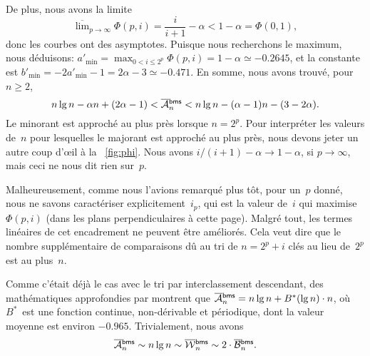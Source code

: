 De plus, nous avons la limite
\begin{equation*}
  \overline\lim_{p \to \infty}\Phi(p,i) = \frac{i}{i+1} - \alpha <
  1 - \alpha = \Phi(0,1),
\end{equation*}
donc les courbes ont des asymptotes. Puisque nous recherchons le
maximum, nous déduisons: \(a'_{\min} = \max_{0 < i \leqslant
  2^p}\Phi(p,i) = 1 - \alpha \simeq -0.2645\), et la constante est
\(b'_{\min} = -2a'_{\min} - 1 = 2\alpha - 3 \simeq -0.471\). En somme,
nous avons trouvé, pour \(n \geqslant 2\),
\begin{equation}
n\lg n - \alpha n + (2\alpha - 1) < \OM{\fun{bms}}{n}
< n\lg n - (\alpha - 1)n - (3 - 2\alpha).
\label{ineq:bounds_Mbms}
\end{equation}
Le minorant est approché au plus près lorsque \(n=2^p\). Pour
interpréter les valeurs de~\(n\) pour lesquelles le majorant est
approché au plus près, nous devons jeter un autre coup d'œil à la
\fig~\vref{fig:phi}. Nous avons \(i/(i+1) - \alpha \to 1 - \alpha\),
si \(p \to \infty\), mais ceci ne nous dit rien
sur~\(p\).

Malheureusement, comme nous l'avions remarqué plus tôt, pour un~\(p\)
donné, nous ne savons caractériser explicitement~\(i_p\), qui est la
valeur de~\(i\) qui maximise \(\Phi(p,i)\) (dans les plans
perpendiculaires à cette page). Malgré tout, les termes linéaires de
cet encadrement ne peuvent être améliorés. Cela veut dire que le
nombre supplémentaire de comparaisons dû au tri de \(n=2^p+i\) clés au
lieu de~\(2^p\) est au plus~\(n\).

Comme c'était déjà le cas avec le tri par interclassement descendant,
des mathématiques approfondies par \cite{PannyProdinger_1995} montrent
que \(\OM{\fun{bms}}{n} = n\lg n + B^*(\lg n) \cdot
n\), où \(B^*\)~est une fonction
continue, non-dérivable et périodique, dont la valeur moyenne est
environ \(-0.965\). Trivialement, nous avons
\begin{equation*}
\OM{\fun{bms}}{n} \sim n\lg n \sim \OW{\fun{bms}}{n} \sim 2 \cdot
\OB{\fun{bms}}{n}.
\end{equation*}


